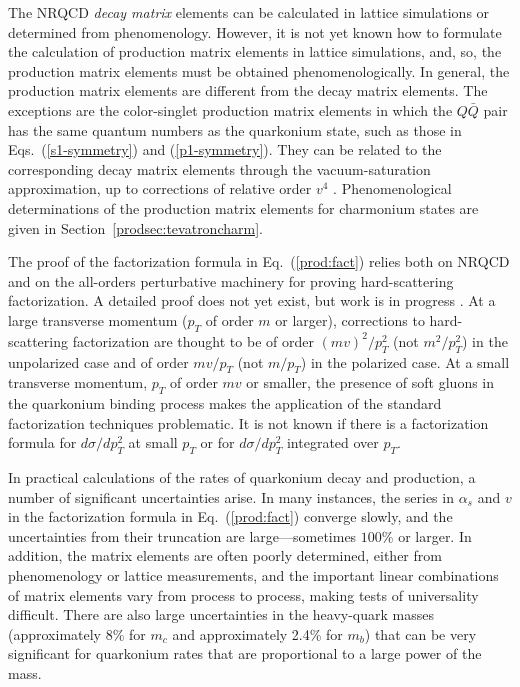The NRQCD {\it decay matrix} elements can be calculated in lattice
simulations \cite{Bodwin:1993wf,Bodwin:1994js,Bodwin:1996tg,%
Bodwin:1996mf,Bodwin:2001mk} or determined from
phenomenology. However, it is not yet known how to formulate the
calculation of production matrix elements in lattice simulations, and,
so, the production matrix elements must be obtained phenomenologically.
In general, the production matrix elements are different from the decay
matrix elements. The exceptions are the color-singlet production matrix
elements in which the $Q \bar Q$ pair has the same quantum numbers as
the quarkonium state, such as those in Eqs.~(\ref{s1-symmetry}) and
(\ref{p1-symmetry}). They can be related to the corresponding decay
matrix elements through the vacuum-saturation approximation, up to
corrections of relative order $v^4$ \cite{Bodwin:1994jh}.
Phenomenological determinations of the 
production matrix elements for charmonium states
are given in Section~\ref{prodsec:tevatroncharm}.

The proof of the factorization formula in Eq.~(\ref{prod:fact}) relies both on
NRQCD and on the all-orders perturbative machinery for proving
hard-scattering factorization.  A detailed proof does not yet exist, but
work is in progress \cite{qiu-sterman}. At a large transverse momentum
($p_T$ of order $m$ or larger), corrections to hard-scattering 
factorization are thought to be of order $(mv)^2/p_T^2$ (not
$m^2/p_T^2$) in the unpolarized case and of order $mv/p_T$ (not $m/p_T$)
in the polarized case. At a small transverse momentum, $p_T$ of order
$mv$ or smaller, the presence of soft gluons in the quarkonium binding
process makes the application of the standard factorization techniques
problematic. It is not known if there is a factorization formula for
$d\sigma/dp_T^2$ at small $p_T$ or for $d\sigma/dp_T^2$ integrated over
$p_T$.

In practical calculations of
the rates of quarkonium decay and production, a number of significant
uncertainties arise. In many instances, the series in $\alpha_s$ and
$v$ in the factorization formula in Eq.~(\ref{prod:fact}) converge slowly,
and the uncertainties from their truncation are large---sometimes
$100\%$ or larger. In addition, the matrix elements are often poorly
determined, either from phenomenology or lattice measurements, and the
important linear combinations of matrix elements vary from process to
process, making tests of universality difficult. There are also large
uncertainties in the heavy-quark masses (approximately 8\% for $m_c$
and approximately 2.4\% for $m_b$) that can be very significant for
quarkonium rates that are proportional to a large power of the mass.

